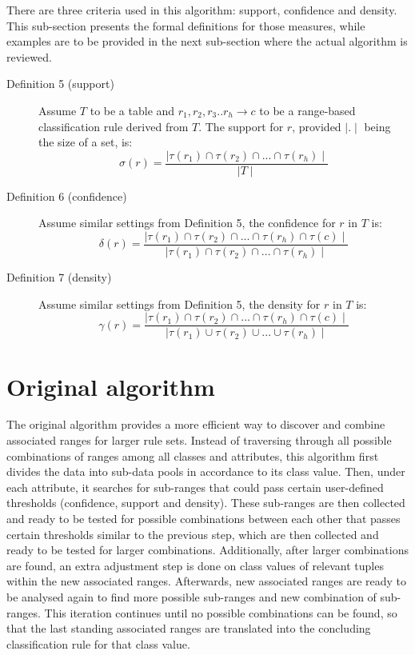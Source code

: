 There are three criteria used in this algorithm: support, confidence and density. This sub-section presents the formal definitions for those measures, while examples are to be provided in the next sub-section where the actual algorithm is reviewed.

\begin{description}
\item[Definition 5 (support)]
Assume $T$ to be a table and $r_1, r_2, r_3..r_h \rightarrow c$ to be a range-based classification rule derived from $T$. The support for $r$, provided $\mid . \mid$ being the size of a set, is: 
\[ \sigma(r) = \frac{\mid \tau(r_1) \cap \tau(r_2) \cap ... \cap \tau(r_h) \mid}{\mid T \mid} \] 

\item[Definition 6 (confidence)]
Assume similar settings from Definition 5, the confidence for $r$  in $T$ is:
\[ \delta(r) = \frac{\mid \tau(r_1) \cap \tau(r_2) \cap ... \cap \tau(r_h) \cap \tau(c) \mid}{\mid \tau(r_1) \cap \tau(r_2) \cap ... \cap \tau(r_h) \mid} \] 

\item[Definition 7 (density)]
Assume similar settings from Definition 5, the density for $r$ in $T$ is:
\[ \gamma(r) = \frac{\mid \tau(r_1) \cap \tau(r_2) \cap ... \cap \tau(r_h) \cap \tau(c) \mid}{\mid \tau(r_1) \cup \tau(r_2) \cup ... \cup \tau(r_h) \mid} \] 

\end{description}


\section{Original algorithm}

The original algorithm provides a more efficient way to discover and combine associated ranges for larger rule sets. Instead of traversing through all possible combinations of ranges among all classes and attributes, this algorithm first divides the data into sub-data pools in accordance to its class value. Then, under each attribute, it searches for sub-ranges that could pass certain user-defined thresholds (confidence, support and density). These sub-ranges are then collected and ready to be tested for possible combinations between each other that passes certain thresholds similar to the previous step, which are then collected and ready to be tested for larger combinations. Additionally, after larger combinations are found, an extra adjustment step is done on class values of relevant tuples within the new associated ranges. Afterwards, new associated ranges are ready to be analysed again to find more possible sub-ranges and new combination of sub-ranges. This iteration continues until no possible combinations can be found, so that the last standing associated ranges are translated into the concluding classification rule for that class value. 

